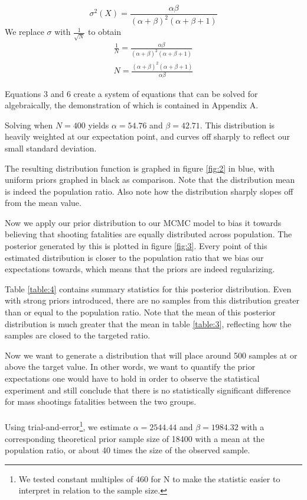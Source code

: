 \documentclass{article}
\begin{document}
\begin{equation}
\sigma^2(X) = \frac{\alpha \beta}{(\alpha + \beta)^2 (\alpha + \beta +1)}
\end{equation}
We replace $\sigma$ with $\frac{1}{\sqrt{N}}$ to obtain
\begin{align}
\frac{1}{N} = \frac{\alpha \beta}{(\alpha + \beta)^2 (\alpha + \beta +1)}\\
N = \frac{(\alpha + \beta)^2 (\alpha + \beta +1)}{\alpha \beta}
\end{align}

Equations 3 and 6 create a system of equations that can be solved for algebraically, the demonstration of which is contained in Appendix A.

Solving when $N = 400$ yields $\alpha = 54.76$ and $\beta =42.71$. This distribution is heavily weighted at our expectation point, and curves off sharply to reflect our small standard deviation.

The resulting distribution function is graphed in figure \ref{fig:2} in blue, with uniform priors graphed in black as comparison. Note that the distribution mean is indeed the population ratio. Also note how the distribution sharply slopes off from the mean value.

Now we apply our prior distribution to our MCMC model to bias it towards believing that shooting fatalities are equally distributed across population. The posterior generated by this is plotted in figure \ref{fig:3}. Every point of this estimated distribution is closer to the population ratio that we bias our expectations towards, which means that the priors are indeed regularizing.

Table \ref{table:4} contains summary statistics for this posterior distribution. Even with strong priors introduced, there are no samples from this distribution greater than or equal to the population ratio. Note that the mean of this posterior distribution is much greater that the mean in table \ref{table:3}, reflecting how the samples are closed to the targeted ratio. 

Now we want to generate a distribution that will place around 500 samples at or above the target value. In other words, we want to quantify the prior expectations one would have to hold in order to observe the statistical experiment and still conclude that there is no statistically significant difference for mass shootings fatalities between the two groups. 
\\
\\
Using trial-and-error\footnote{We tested constant multiples of 460 for N to make the statistic easier to interpret in relation to the sample size. }, we estimate $\alpha = 2544.44$ and $\beta = 1984.32$ with a corresponding theoretical prior sample size of 18400 with a mean at the population ratio, or about 40 times the size of the observed sample.
\end{document}
